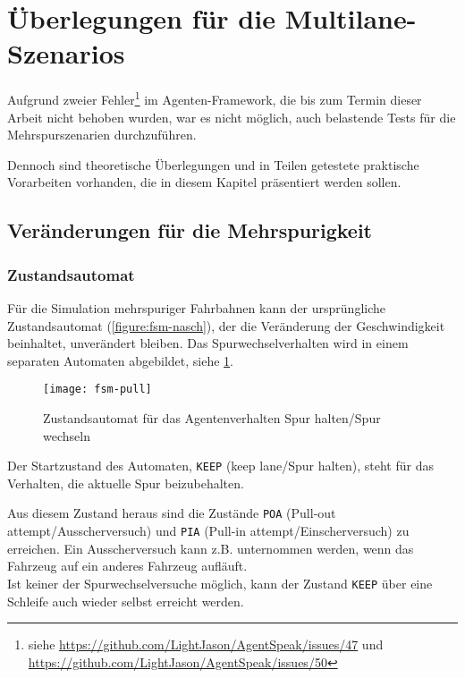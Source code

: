 \section{Überlegungen für die Multilane-Szenarios}
\label{sec:ueberlegungen-multilane}

Aufgrund zweier Fehler\footnote{siehe \url{https://github.com/LightJason/AgentSpeak/issues/47} und \url{https://github.com/LightJason/AgentSpeak/issues/50}} im Agenten-Framework, die bis zum Termin dieser Arbeit nicht behoben wurden, war es nicht möglich, auch belastende Tests für die Mehrspurszenarien durchzuführen.

Dennoch sind theoretische Überlegungen und in Teilen getestete praktische Vorarbeiten vorhanden, die in diesem Kapitel präsentiert werden sollen.





\subsection{Veränderungen für die Mehrspurigkeit}
\label{sec:multilane-change}


\subsubsection{Zustandsautomat}

Für die Simulation mehrspuriger Fahrbahnen kann der ursprüngliche Zustandsautomat (\cref{figure:fsm-nasch}), der die Veränderung der Geschwindigkeit beinhaltet, unverändert bleiben.
Das Spurwechselverhalten wird in einem separaten Automaten abgebildet, siehe \cref{figure:fsm-pull}.

\begin{figure}[hptb]
 \centering
 \texttt{[image: fsm-pull]}
 \caption[Zustandsautomat für das Spurverhalten]
 		{Zustandsautomat für das Agentenverhalten Spur halten/Spur wechseln}
 \label{figure:fsm-pull}
\end{figure}

Der Startzustand des Automaten, \texttt{KEEP} (keep lane/Spur halten), steht für das Verhalten, die aktuelle Spur beizubehalten.

Aus diesem Zustand heraus sind die Zustände \texttt{POA} (Pull-out attempt/Ausscherversuch) und \texttt{PIA} (Pull-in attempt/Einscherversuch) zu erreichen.
Ein Ausscherversuch kann z.B. unternommen werden, wenn das Fahrzeug auf ein anderes Fahrzeug aufläuft.
\\
Ist keiner der Spurwechselversuche möglich, kann der Zustand \texttt{KEEP} über eine Schleife auch wieder selbst erreicht werden.

